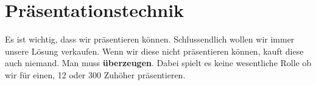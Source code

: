 \chapter{Präsentationstechnik}
Es ist wichtig, dass wir präsentieren können. Schlussendlich wollen wir immer unsere Lösung verkaufen. Wenn wir diese nicht präsentieren können, kauft diese auch niemand. Man muss \textbf{überzeugen}. Dabei spielt es keine wesentliche Rolle ob wir für einen, 12 oder 300 Zuhöher präsentieren.